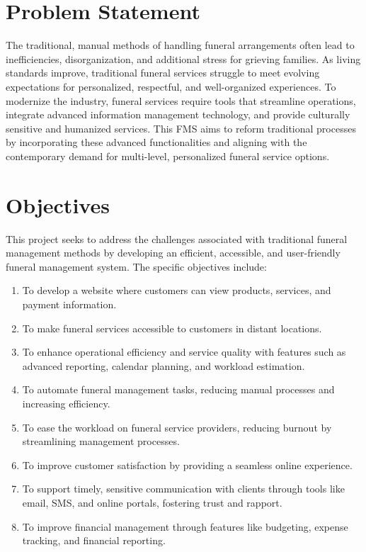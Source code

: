 \documentclass[a4paper,12pt]{report}
\begin{document}
\section{Problem Statement}
The traditional, manual methods of handling funeral arrangements often lead to inefficiencies, disorganization, and additional stress for grieving families. As living standards improve, traditional funeral services struggle to meet evolving expectations for personalized, respectful, and well-organized experiences. To modernize the industry, funeral services require tools that streamline operations, integrate advanced information management technology, and provide culturally sensitive and humanized services. This FMS aims to reform traditional processes by incorporating these advanced functionalities and aligning with the contemporary demand for multi-level, personalized funeral service options.

\section{Objectives}
This project seeks to address the challenges associated with traditional funeral management methods by developing an efficient, accessible, and user-friendly funeral management system. The specific objectives include:
\begin{enumerate}
    \item To develop a website where customers can view products, services, and payment information.
    \item To make funeral services accessible to customers in distant locations.
    \item To enhance operational efficiency and service quality with features such as advanced reporting, calendar planning, and workload estimation.
    \item To automate funeral management tasks, reducing manual processes and increasing efficiency.
    \item To ease the workload on funeral service providers, reducing burnout by streamlining management processes.
    \item To improve customer satisfaction by providing a seamless online experience.
    \item To support timely, sensitive communication with clients through tools like email, SMS, and online portals, fostering trust and rapport.
    \item To improve financial management through features like budgeting, expense tracking, and financial reporting.
\end{enumerate}
\end{document}
